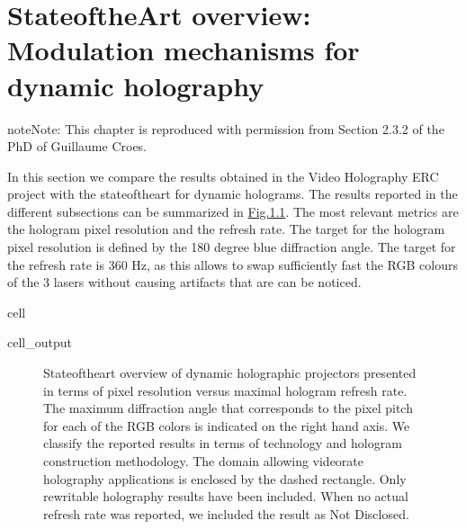 \documentclass[a4paper,10pt,english,openany,oneside]{jupyterBook}
\begin{document}
\chapter{State\sphinxhyphen{}of\sphinxhyphen{}the\sphinxhyphen{}Art overview: Modulation mechanisms for dynamic holography}
\label{\detokenize{sota:state-of-the-art-overview-modulation-mechanisms-for-dynamic-holography}}\label{\detokenize{sota::doc}}
\begin{sphinxadmonition}{note}{Note:}
\sphinxAtStartPar
This chapter is reproduced with permission from Section 2.3.2 of the PhD of Guillaume Croes.
\end{sphinxadmonition}

\sphinxAtStartPar
In this section we compare the results obtained in the Video Holography ERC project with the state\sphinxhyphen{}of\sphinxhyphen{}the\sphinxhyphen{}art for dynamic holograms.
The results reported in the different subsections can be summarized in \hyperref[\detokenize{sota:sota}]{Fig.\@ \ref{\detokenize{sota:sota}}}.
The most relevant metrics are the hologram pixel resolution and the refresh rate.
The target for the hologram pixel resolution is defined by the 180 degree blue diffraction angle.
The target for the refresh rate is 360 Hz, as this allows to swap sufficiently fast the RGB colours of the 3 lasers without causing artifacts that are can be noticed.

\begin{sphinxuseclass}{cell}\begin{sphinxVerbatimOutput}

\begin{sphinxuseclass}{cell_output}
\begin{figure}[htbp]
\centering
\capstart

\noindent{}
\caption{State\sphinxhyphen{}of\sphinxhyphen{}the\sphinxhyphen{}art overview of dynamic holographic projectors presented in terms of pixel resolution versus maximal hologram refresh rate.  The maximum diffraction angle that corresponds to the pixel pitch for each of the RGB colors is indicated on the right hand axis. We classify the reported results in terms of technology and hologram construction methodology. The domain allowing video\sphinxhyphen{}rate holography applications is enclosed by the dashed rectangle.  Only rewritable holography results have been included. When no actual refresh rate was reported, we included the result as Not Disclosed.}\label{\detokenize{sota:sota}}\end{figure}

\end{sphinxuseclass}\end{sphinxVerbatimOutput}

\end{sphinxuseclass}
\end{document}
